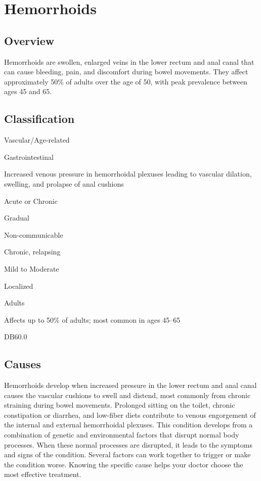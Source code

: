 \chapter{Hemorrhoids}
\label{sec:Hemorrhoids}

\section{Overview}
Hemorrhoids are swollen, enlarged veins in the lower rectum and anal canal that can cause bleeding, pain, and discomfort during bowel movements. They affect approximately 50\% of adults over the age of 50, with peak prevalence between ages 45 and 65.
\section{Classification}

\begin{description}[font=\normalfont\bfseries,leftmargin=3em,labelwidth=2.5em]
  \item[Cause] Vascular/Age-related
  \item[Organ System] Gastrointestinal
  \item[Pathophysiology] Increased venous pressure in hemorrhoidal plexuses leading to vascular dilation, swelling, and prolapse of anal cushions
  \item[Duration] Acute or Chronic
  \item[Onset] Gradual
  \item[Mode of Transmission] Non-communicable
  \item[Clinical Course] Chronic, relapsing
  \item[Severity] Mild to Moderate
  \item[Extent of Disease] Localized
  \item[Age Group] Adults
  \item[Epidemiology] Affects up to 50\% of adults; most common in ages 45--65
  \item[ICD-11 Code] DB60.0
\end{description}

\section{Causes}
Hemorrhoids develop when increased pressure in the lower rectum and anal canal causes the vascular cushions to swell and distend, most commonly from chronic straining during bowel movements. Prolonged sitting on the toilet, chronic constipation or diarrhea, and low-fiber diets contribute to venous engorgement of the internal and external hemorrhoidal plexuses. This condition develops from a combination of genetic and environmental factors that disrupt normal body processes. When these normal processes are disrupted, it leads to the symptoms and signs of the condition. Several factors can work together to trigger or make the condition worse. Knowing the specific cause helps your doctor choose the most effective treatment.

